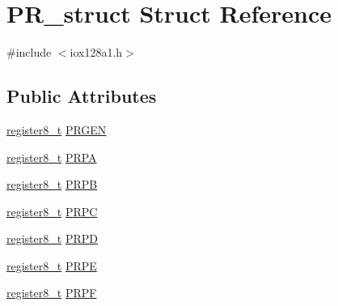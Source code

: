 \hypertarget{struct_p_r__struct}{
\section{PR\_\-struct Struct Reference}
\label{struct_p_r__struct}
}


{\ttfamily \#include $<$iox128a1.h$>$}

\subsection*{Public Attributes}
\begin{DoxyCompactItemize}
\item 
\hyperlink{iox128a1_8h_a6a0649252b392263406882923b04a9db}{register8\_\-t} \hyperlink{struct_p_r__struct_ab94c5e750b8aa6fb1073a6fe3dcb4e8c}{PRGEN}
\item 
\hyperlink{iox128a1_8h_a6a0649252b392263406882923b04a9db}{register8\_\-t} \hyperlink{struct_p_r__struct_a085b84a3b5230193604c1b677ba8f5e3}{PRPA}
\item 
\hyperlink{iox128a1_8h_a6a0649252b392263406882923b04a9db}{register8\_\-t} \hyperlink{struct_p_r__struct_a9e91484649b2a79c64d7eecd0e8878f3}{PRPB}
\item 
\hyperlink{iox128a1_8h_a6a0649252b392263406882923b04a9db}{register8\_\-t} \hyperlink{struct_p_r__struct_a795e9fe0b56aca1fa377bc83bb0b9e9c}{PRPC}
\item 
\hyperlink{iox128a1_8h_a6a0649252b392263406882923b04a9db}{register8\_\-t} \hyperlink{struct_p_r__struct_a16393fdf8b1b9c7b92e6b65ac0b2689f}{PRPD}
\item 
\hyperlink{iox128a1_8h_a6a0649252b392263406882923b04a9db}{register8\_\-t} \hyperlink{struct_p_r__struct_a7e9e5ab03b925dff588a2a9b03c008dd}{PRPE}
\item 
\hyperlink{iox128a1_8h_a6a0649252b392263406882923b04a9db}{register8\_\-t} \hyperlink{struct_p_r__struct_a7c5a1e0e455d902eb9a093f37e63a12d}{PRPF}
\end{DoxyCompactItemize}


